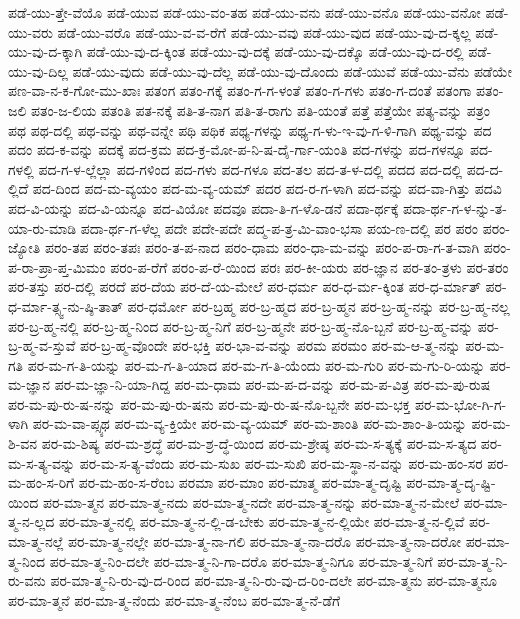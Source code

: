 {ಪಡೆ-ಯು-ತ್ತೇ-ವೆಯೊ
ಪಡೆ-ಯುವ
ಪಡೆ-ಯು-ವಂ-ತಹ
ಪಡೆ-ಯು-ವನು
ಪಡೆ-ಯು-ವನೊ
ಪಡೆ-ಯು-ವನೋ
ಪಡೆ-ಯು-ವರು
ಪಡೆ-ಯು-ವರೊ
ಪಡೆ-ಯು-ವ-ವ-ರೆಗೆ
ಪಡೆ-ಯು-ವವು
ಪಡೆ-ಯು-ವುದ
ಪಡೆ-ಯು-ವು-ದ-ಕ್ಕಲ್ಲ
ಪಡೆ-ಯು-ವು-ದ-ಕ್ಕಾಗಿ
ಪಡೆ-ಯು-ವು-ದ-ಕ್ಕಿಂತ
ಪಡೆ-ಯು-ವು-ದಕ್ಕೆ
ಪಡೆ-ಯು-ವು-ದಕ್ಕೊ
ಪಡೆ-ಯು-ವು-ದ-ರಲ್ಲಿ
ಪಡೆ-ಯು-ವು-ದಿಲ್ಲ
ಪಡೆ-ಯು-ವುದು
ಪಡೆ-ಯು-ವು-ದೆಲ್ಲ
ಪಡೆ-ಯು-ವು-ದೊಂದು
ಪಡೆ-ಯುವೆ
ಪಡೆ-ಯು-ವೆನು
ಪಡೆಯೇ
ಪಣ-ವಾ-ನ-ಕ-ಗೋ-ಮು-ಖಾಃ
ಪತಂಗ
ಪತಂ-ಗಕ್ಕೆ
ಪತಂ-ಗ-ಗ-ಳಂತೆ
ಪತಂ-ಗ-ಗಳು
ಪತಂ-ಗ-ದಂತೆ
ಪತಂಗಾ
ಪತಂ-ಜಲಿ
ಪತಂ-ಜ-ಲಿಯ
ಪತಂತಿ
ಪತ-ನಕ್ಕೆ
ಪತಿ-ತ-ನಾಗ
ಪತಿ-ತ-ರಾಗು
ಪತಿ-ಯಂತೆ
ಪತ್ತೆ
ಪತ್ತೆಯೇ
ಪತ್ಯ-ವನ್ನು
ಪತ್ರಂ
ಪಥ
ಪಥ-ದಲ್ಲಿ
ಪಥ-ವನ್ನು
ಪಥ-ವನ್ನೇ
ಪಥಿ
ಪಥಿಕ
ಪಥ್ಯ-ಗಳನ್ನು
ಪಥ್ಯ-ಗ-ಳು-ಇ-ವು-ಗ-ಳಿ-ಗಾಗಿ
ಪಥ್ಯ-ವನ್ನು
ಪದ
ಪದಂ
ಪದ-ಕ-ವನ್ನು
ಪದಕ್ಕೆ
ಪದ-ಕ್ರಮ
ಪದ-ಕ್ರ-ಮೋ-ಪ-ನಿ-ಷ-ದೈ-ರ್ಗಾ-ಯಂತಿ
ಪದ-ಗಳನ್ನು
ಪದ-ಗಳನ್ನೂ
ಪದ-ಗಳಲ್ಲಿ
ಪದ-ಗ-ಳ-ಲ್ಲೆಲ್ಲಾ
ಪದ-ಗಳಿಂದ
ಪದ-ಗಳು
ಪದ-ಗಳೂ
ಪದ-ತಲ
ಪದ-ತ-ಳ-ದಲ್ಲಿ
ಪದದ
ಪದ-ದಲ್ಲಿ
ಪದ-ದ-ಲ್ಲಿದೆ
ಪದ-ದಿಂದ
ಪದ-ಮ-ವ್ಯಯಂ
ಪದ-ಮ-ವ್ಯ-ಯಮ್
ಪದರ
ಪದ-ರ-ಗ-ಳಾಗಿ
ಪದ-ವನ್ನು
ಪದ-ವಾ-ಗಿತ್ತು
ಪದವಿ
ಪದ-ವಿ-ಯನ್ನು
ಪದ-ವಿ-ಯನ್ನೂ
ಪದ-ವಿಯೋ
ಪದವೂ
ಪದಾ-ತಿ-ಗ-ಳೊ-ಡನೆ
ಪದಾ-ರ್ಥಕ್ಕೆ
ಪದಾ-ರ್ಥ-ಗ-ಳ-ನ್ನು-ತ-ಯಾ-ರು-ಮಾಡಿ
ಪದಾ-ರ್ಥ-ಗ-ಳೆಲ್ಲ
ಪದೇ
ಪದೇ-ಪದೇ
ಪದ್ಮ-ಪ-ತ್ರ-ಮಿ-ವಾಂ-ಭಸಾ
ಪಯ-ಣ-ದಲ್ಲಿ
ಪರ
ಪರಂ
ಪರಂ-ಜ್ಯೋತಿ
ಪರಂ-ತಪ
ಪರಂ-ತಪಃ
ಪರಂ-ತ-ಪ-ನಾದ
ಪರಂ-ಧಾಮ
ಪರಂ-ಧಾ-ಮ-ವನ್ನು
ಪರಂ-ಪ-ರಾ-ಗ-ತ-ವಾಗಿ
ಪರಂ-ಪ-ರಾ-ಪ್ರಾ-ಪ್ತ-ಮಿಮಂ
ಪರಂ-ಪ-ರೆಗೆ
ಪರಂ-ಪ-ರೆ-ಯಿಂದ
ಪರಃ
ಪರ-ಕೀ-ಯರು
ಪರ-ಜ್ಞಾನ
ಪರ-ತಂ-ತ್ರಳು
ಪರ-ತರಂ
ಪರ-ತಸ್ತು
ಪರ-ದಲ್ಲಿ
ಪರದೆ
ಪರ-ದೆಯ
ಪರ-ದೆ-ಯ-ಮೇಲೆ
ಪರ-ಧರ್ಮ
ಪರ-ಧ-ರ್ಮ-ಕ್ಕಿಂತ
ಪರ-ಧ-ರ್ಮಾತ್
ಪರ-ಧ-ರ್ಮಾ-ತ್ಸ್ವ-ನು-ಷ್ಠಿ-ತಾತ್
ಪರ-ಧರ್ಮೋ
ಪರ-ಬ್ರಹ್ಮ
ಪರ-ಬ್ರ-ಹ್ಮದ
ಪರ-ಬ್ರ-ಹ್ಮನ
ಪರ-ಬ್ರ-ಹ್ಮ-ನನ್ನು
ಪರ-ಬ್ರ-ಹ್ಮ-ನಲ್ಲ
ಪರ-ಬ್ರ-ಹ್ಮ-ನಲ್ಲಿ
ಪರ-ಬ್ರ-ಹ್ಮ-ನಿಂದ
ಪರ-ಬ್ರ-ಹ್ಮ-ನಿಗೆ
ಪರ-ಬ್ರ-ಹ್ಮನೇ
ಪರ-ಬ್ರ-ಹ್ಮ-ನೊ-ಬ್ಬನೆ
ಪರ-ಬ್ರ-ಹ್ಮ-ವನ್ನು
ಪರ-ಬ್ರ-ಹ್ಮ-ವ-ಸ್ತುವೆ
ಪರ-ಬ್ರ-ಹ್ಮ-ವೊಂದೇ
ಪರ-ಭಕ್ತಿ
ಪರ-ಭಾ-ವ-ವನ್ನು
ಪರಮ
ಪರಮಂ
ಪರ-ಮ-ಆ-ತ್ಮ-ನನ್ನು
ಪರ-ಮ-ಗತಿ
ಪರ-ಮ-ಗ-ತಿ-ಯನ್ನು
ಪರ-ಮ-ಗ-ತಿ-ಯಾದ
ಪರ-ಮ-ಗ-ತಿ-ಯೆಂದು
ಪರ-ಮ-ಗುರಿ
ಪರ-ಮ-ಗು-ರಿ-ಯನ್ನು
ಪರ-ಮ-ಜ್ಞಾನ
ಪರ-ಮ-ಜ್ಞಾ-ನಿ-ಯಾ-ಗಿದ್ದ
ಪರ-ಮ-ಧಾಮ
ಪರ-ಮ-ಪ-ದ-ವನ್ನು
ಪರ-ಮ-ಪ-ವಿತ್ರ
ಪರ-ಮ-ಪು-ರುಷ
ಪರ-ಮ-ಪು-ರು-ಷ-ನನ್ನು
ಪರ-ಮ-ಪು-ರು-ಷನು
ಪರ-ಮ-ಪು-ರು-ಷ-ನೊ-ಬ್ಬನೇ
ಪರ-ಮ-ಭಕ್ತ
ಪರ-ಮ-ಭೋ-ಗಿ-ಗ-ಳಾಗಿ
ಪರ-ಮ-ವಾ-ಪ್ಸ್ಯಥ
ಪರ-ಮ-ವ್ಯ-ಕ್ತಿಯೇ
ಪರ-ಮ-ವ್ಯ-ಯಮ್
ಪರ-ಮ-ಶಾಂತಿ
ಪರ-ಮ-ಶಾಂ-ತಿ-ಯನ್ನು
ಪರ-ಮ-ಶಿ-ವನ
ಪರ-ಮ-ಶಿಷ್ಯ
ಪರ-ಮ-ಶ್ರದ್ಧೆ
ಪರ-ಮ-ಶ್ರ-ದ್ಧೆ-ಯಿಂದ
ಪರ-ಮ-ಶ್ರೇಷ್ಠ
ಪರ-ಮ-ಸ-ತ್ಯಕ್ಕೆ
ಪರ-ಮ-ಸ-ತ್ಯದ
ಪರ-ಮ-ಸ-ತ್ಯ-ವನ್ನು
ಪರ-ಮ-ಸ-ತ್ಯ-ವೆಂದು
ಪರ-ಮ-ಸುಖ
ಪರ-ಮ-ಸುಖಿ
ಪರ-ಮ-ಸ್ಥಾ-ನ-ವನ್ನು
ಪರ-ಮ-ಹಂ-ಸರ
ಪರ-ಮ-ಹಂ-ಸ-ರಿಗೆ
ಪರ-ಮ-ಹಂ-ಸ-ರೆಂಬ
ಪರಮಾ
ಪರ-ಮಾಂ
ಪರ-ಮಾತ್ಮ
ಪರ-ಮಾ-ತ್ಮ-ದೃಷ್ಟಿ
ಪರ-ಮಾ-ತ್ಮ-ದೃ-ಷ್ಟಿ-ಯಿಂದ
ಪರ-ಮಾ-ತ್ಮನ
ಪರ-ಮಾ-ತ್ಮ-ನದು
ಪರ-ಮಾ-ತ್ಮ-ನದೇ
ಪರ-ಮಾ-ತ್ಮ-ನನ್ನು
ಪರ-ಮಾ-ತ್ಮ-ನ-ಮೇಲೆ
ಪರ-ಮಾ-ತ್ಮ-ನ-ಲ್ಲದ
ಪರ-ಮಾ-ತ್ಮ-ನಲ್ಲಿ
ಪರ-ಮಾ-ತ್ಮ-ನ-ಲ್ಲಿ-ಡ-ಬೇಕು
ಪರ-ಮಾ-ತ್ಮ-ನ-ಲ್ಲಿಯೇ
ಪರ-ಮಾ-ತ್ಮ-ನ-ಲ್ಲಿವೆ
ಪರ-ಮಾ-ತ್ಮ-ನಲ್ಲೆ
ಪರ-ಮಾ-ತ್ಮ-ನಲ್ಲೇ
ಪರ-ಮಾ-ತ್ಮ-ನಾ-ಗಲಿ
ಪರ-ಮಾ-ತ್ಮ-ನಾ-ದರೊ
ಪರ-ಮಾ-ತ್ಮ-ನಾ-ದರೋ
ಪರ-ಮಾ-ತ್ಮ-ನಿಂದ
ಪರ-ಮಾ-ತ್ಮ-ನಿಂ-ದಲೇ
ಪರ-ಮಾ-ತ್ಮ-ನಿ-ಗಾ-ದರೊ
ಪರ-ಮಾ-ತ್ಮ-ನಿಗೂ
ಪರ-ಮಾ-ತ್ಮ-ನಿಗೆ
ಪರ-ಮಾ-ತ್ಮ-ನಿ-ರು-ವನು
ಪರ-ಮಾ-ತ್ಮ-ನಿ-ರು-ವು-ದ-ರಿಂದ
ಪರ-ಮಾ-ತ್ಮ-ನಿ-ರು-ವು-ದ-ರಿಂ-ದಲೇ
ಪರ-ಮಾ-ತ್ಮನು
ಪರ-ಮಾ-ತ್ಮನೂ
ಪರ-ಮಾ-ತ್ಮನೆ
ಪರ-ಮಾ-ತ್ಮ-ನೆಂದು
ಪರ-ಮಾ-ತ್ಮ-ನೆಂಬ
ಪರ-ಮಾ-ತ್ಮ-ನೆ-ಡೆಗೆ
}
